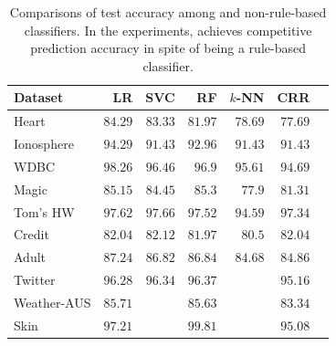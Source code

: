 \begin{table}
	\caption[Accuracy of {\crr} and non-rule-based classifiers]{Comparisons of test accuracy among {\crr} and  non-rule-based classifiers. In the experiments, {\crr} achieves competitive prediction accuracy in spite of being a rule-based classifier.}
	\label{interpretability_crr_tab:all_classifiers}
	\begin{center}
		\begin{tabular}{l   r r r r r  r }
			\toprule
			{Dataset}  & LR & SVC & RF & $k$-NN & CRR\\\midrule
			\multirow{1}{*}{ Heart}   & $   84.29  $    & $   83.33  $    & $   81.97  $    & $   78.69  $    & $   77.69  $   \\ 
			\multirow{1}{*}{ Ionosphere}   & $   94.29  $    & $   91.43  $    & $   92.96  $    & $   91.43  $    & $   91.43  $   \\ 
			\multirow{1}{*}{ WDBC}   & $   98.26  $    & $   96.46  $    & $   96.9  $    & $   95.61  $    & $   94.69  $   \\ 
			\multirow{1}{*}{ Magic}   & $   85.15  $    & $   84.45  $    & $   85.3  $    & $   77.9  $    & $   81.31  $   \\ 
			\multirow{1}{*}{ Tom's HW}   & $   97.62  $    & $   97.66  $    & $   97.52  $    & $   94.59  $    & $   97.34  $   \\ 
			\multirow{1}{*}{ Credit}   & $   82.04  $    & $   82.12  $    & $   81.97  $    & $   80.5  $    & $   82.04  $   \\ 
			\multirow{1}{*}{ Adult}   & $   87.24  $    & $   86.82  $    & $   86.84  $    & $   84.68  $    & $   84.86  $   \\ 
			\multirow{1}{*}{ Twitter}   & $   96.28  $    & $   96.34  $    & $   96.37  $     &  \multicolumn{1}{c}{\textemdash}      & $   95.16  $   \\ 
			\multirow{1}{*}{ Weather-AUS}   & $   85.71  $     &  \multicolumn{1}{c}{\textemdash}      & $   85.63  $     &  \multicolumn{1}{c}{\textemdash}      & $   83.34  $   \\ 
			\multirow{1}{*}{ Skin}   & $   97.21  $     &  \multicolumn{1}{c}{\textemdash}      & $   99.81  $     &  \multicolumn{1}{c}{\textemdash}      & $   95.08  $   \\ 
			\bottomrule
		\end{tabular}
	\end{center}
\end{table}





